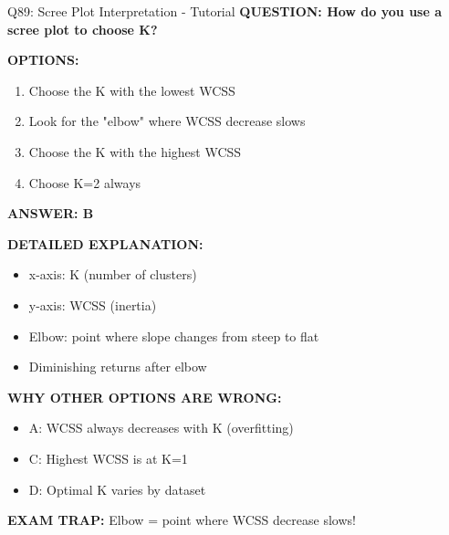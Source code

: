 \documentclass[8pt]{beamer}
\begin{document}
	\begin{frame}{Q89: Scree Plot Interpretation - Tutorial}
		\fontsize{6.5}{7.5}\selectfont
		\textbf{QUESTION: How do you use a scree plot to choose K?}
		
		\vspace{0.1cm}
		\textbf{OPTIONS:}
		\begin{enumerate}
			\item Choose the K with the lowest WCSS
			\item Look for the "elbow" where WCSS decrease slows
			\item Choose the K with the highest WCSS
			\item Choose K=2 always
		\end{enumerate}
		
		\vspace{0.1cm}
		\textcolor{myblue}{\textbf{ANSWER: B}}
		
		\vspace{0.1cm}
		\textbf{DETAILED EXPLANATION:}
		\begin{itemize}
			\item x-axis: K (number of clusters)
			\item y-axis: WCSS (inertia)
			\item Elbow: point where slope changes from steep to flat
			\item Diminishing returns after elbow
		\end{itemize}
		
		\vspace{0.1cm}
		\textcolor{myred}{\textbf{WHY OTHER OPTIONS ARE WRONG:}}
		\begin{itemize}
			\item \textcolor{myred}{A:} WCSS always decreases with K (overfitting)
			\item \textcolor{myred}{C:} Highest WCSS is at K=1
			\item \textcolor{myred}{D:} Optimal K varies by dataset
		\end{itemize}
		
		\textcolor{myred}{\textbf{EXAM TRAP:}} Elbow = \textcolor{myblue}{point where WCSS decrease slows}!
	\end{frame}
	
\end{document}
